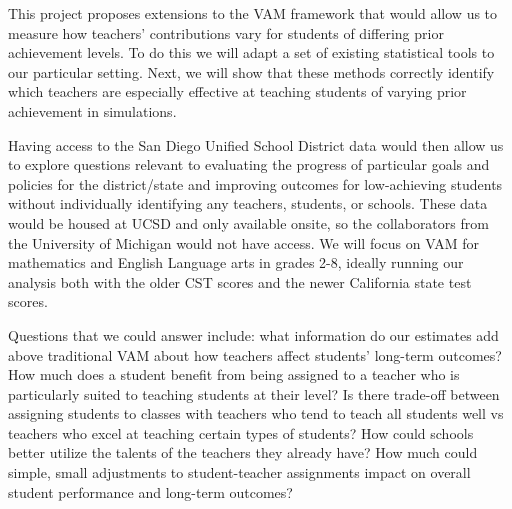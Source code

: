 \documentclass[letterpaper,12pt]{article}
\begin{document}
This project proposes extensions to the VAM framework that would allow us to measure how teachers' contributions vary for students of differing prior achievement levels. To do this we will adapt a set of existing statistical tools to our particular setting. Next, we will show that these methods correctly identify which teachers are especially effective at teaching students of varying prior achievement in simulations. 


Having access to the San Diego Unified School District data would then allow us to explore questions relevant to evaluating the progress of particular goals and policies for the district/state and improving outcomes for low-achieving students without individually identifying any teachers, students, or schools. These data would be housed at UCSD and only available onsite, so the collaborators from the University of Michigan would not have access. We will focus on VAM for mathematics and English Language arts in grades 2-8, ideally running our analysis both with the older CST scores and the newer California state test scores.

Questions that we could answer include: what information do our estimates add above traditional VAM about how teachers affect students' long-term outcomes? How much does a student benefit from being assigned to a teacher who is particularly suited to teaching students at their level? Is there trade-off between assigning students to classes with teachers who tend to teach all students well vs teachers who excel at teaching certain types of students? How could schools better utilize the talents of the teachers they already have? How much could simple, small adjustments to student-teacher assignments impact on overall student performance and long-term outcomes?

\end{document}
